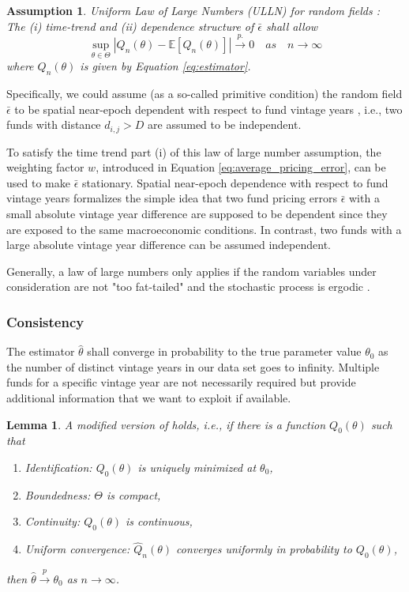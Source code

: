 \documentclass[12pt]{article}
\newtheorem{assume}{Assumption}
\newtheorem{lemma}{Lemma}
\begin{document}
\begin{assume}
	\label{as:lln}
	Uniform Law of Large Numbers (ULLN) for random fields \cite[Equation 6]{JP09}: \\
	The (i) time-trend and (ii) dependence structure of $\bar{\epsilon}$ shall allow
	\[
	\sup_{\theta \in \Theta} \left| Q_n(\theta) -  \mathbb{E} \left[ Q_n(\theta) \right] 
	\right| \xrightarrow{p.} 0
	\quad {as} \quad n \to \infty
	\]
	where $Q_n(\theta)$ is given by Equation \ref{eq:estimator}.
\end{assume}
Specifically, we could assume (as a so-called primitive condition) the random field $\bar{\epsilon}$ to be spatial near-epoch dependent with respect to fund vintage years \citep{JP09,JP12}, i.e., two funds with distance $d_{i,j}>D$ are assumed to be independent.
	
To satisfy the time trend part (i) of this law of large number assumption, the weighting factor $w$, introduced in Equation \ref{eq:average_pricing_error}, can be used to make $\bar{\epsilon}$ stationary.
Spatial near-epoch dependence with respect to fund vintage years formalizes the simple idea that two fund pricing errors $\bar{\epsilon}$ with a small absolute vintage year difference are supposed to be dependent since they are exposed to the same macroeconomic conditions.
In contrast, two funds with a large absolute vintage year difference can be assumed independent.

Generally, a law of large numbers only applies if the random variables under consideration are not "too fat-tailed" and the stochastic process is ergodic \citep{Taleb20}.


\subsubsection{Consistency}

The estimator $\hat{\theta}$ shall converge in probability to the true parameter value $\theta_0$ as the number of distinct vintage years in our data set goes to infinity.
Multiple funds for a specific vintage year are not necessarily required but provide additional information that we want to exploit if available.

\begin{lemma}
	\label{lem:consistency}
	A modified version of \citep[Theorem 2.1]{NM94} holds, i.e.,
	if there is a function $Q_0(\theta)$ such that 
	\begin{enumerate}
		\item Identification: $Q_0(\theta)$ is uniquely minimized at $\theta_0$,
		\item Boundedness: $\Theta$ is compact,
		\item Continuity: $Q_0(\theta)$ is continuous,
		\item Uniform convergence: $\hat{Q}_n(\theta)$ converges uniformly in probability to $Q_0(\theta)$,
	\end{enumerate}
	then $\hat{\theta} \xrightarrow{p} \theta_0$ as $n \rightarrow \infty$.
\end{lemma}
\end{document}
